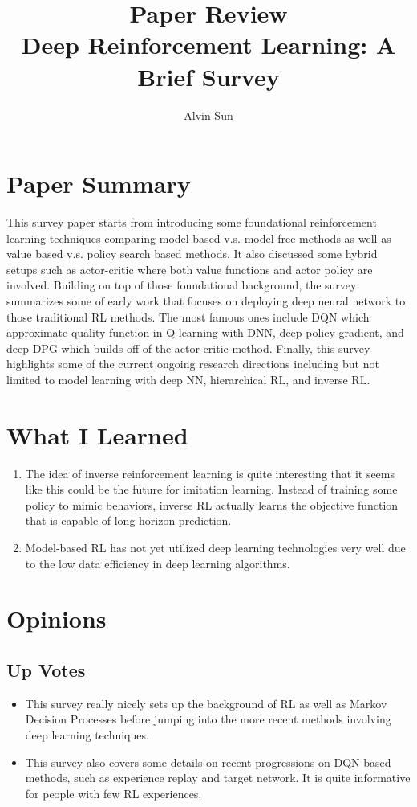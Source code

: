 \documentclass[10pt, twocolumn]{article}
\title{\vspace{-3.0em}Paper Review\\Deep Reinforcement Learning: A Brief Survey}
\author{Alvin Sun}
\begin{document}
\maketitle

\section{Paper Summary}
This survey paper starts from introducing some foundational reinforcement
learning techniques comparing model-based v.s. model-free methods as well as
value based v.s. policy search based methods. It also discussed some hybrid
setups such as actor-critic where both value functions and actor policy are
involved. Building on top of those foundational background, the survey
summarizes some of early work that focuses on deploying deep
neural network to those traditional RL methods. The most famous ones include
DQN which approximate quality function in Q-learning with DNN,
deep policy gradient, and deep DPG which builds off of the actor-critic method.
Finally, this survey highlights some of the current ongoing research directions
including but not limited to model learning with deep NN, hierarchical RL,
and inverse RL.

\section{What I Learned}
\begin{enumerate}
  \item The idea of inverse reinforcement learning is quite interesting that
    it seems like this could be the future for imitation learning. Instead of
    training some policy to mimic behaviors, inverse RL actually learns the
    objective function that is capable of long horizon prediction.
  \item Model-based RL has not yet utilized deep learning technologies very well
    due to the low data efficiency in deep learning algorithms.
\end{enumerate}

\section{Opinions}

\subsection{Up Votes}
\begin{itemize}
  \item This survey really nicely sets up the background of RL as well as Markov Decision
    Processes before jumping into the more recent methods involving deep learning
    techniques.
  \item This survey also covers some details on recent progressions on DQN based
    methods, such as experience replay and target network. It is quite informative
    for people with few RL experiences.
\end{itemize}
\end{document}
